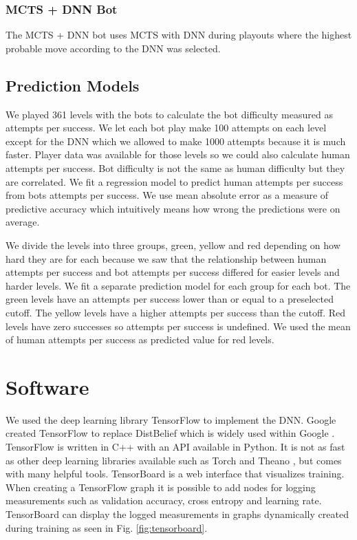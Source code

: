 \documentclass{kththesis}
\begin{document}
\subsubsection{MCTS + DNN Bot}
The MCTS + DNN bot uses MCTS with DNN during playouts where the highest probable move according to the DNN was selected.

\subsection{Prediction Models}
We played 361 levels with the bots to calculate the bot difficulty measured as attempts per success. We let each bot play make 100 attempts on each level except for the DNN which we allowed to make 1000 attempts because it is much faster. Player data was available for those levels so we could also calculate human attempts per success. Bot difficulty is not the same as human difficulty but they are correlated. We fit a regression model to predict human attempts per success from bots attempts per success. We use mean absolute error as a measure of predictive accuracy which intuitively means how wrong the predictions were on average.

We divide the levels into three groups, green, yellow and red depending on how hard they are for each because we saw that the relationship between human attempts per success and bot attempts per success differed for easier levels and harder levels. We fit a separate prediction model for each group for each bot. The green levels have an attempts per success lower than or equal to a preselected cutoff. The yellow levels  have a higher attempts per success than the cutoff. Red levels have zero successes so attempts per success is undefined. We used the mean of human attempts per success as predicted value for red levels.

\section{Software}
We used the deep learning library TensorFlow to implement the DNN. Google created TensorFlow to replace DistBelief which is widely used within Google \cite{abadi2016tensorflow}. TensorFlow is written in C++ with an API available in Python. It is not as fast as other deep learning libraries available such as Torch and Theano \cite{bahrampour2015comparative}, but comes with many helpful tools. TensorBoard is a web interface that visualizes training. When creating a TensorFlow graph it is possible to add nodes for logging measurements such as validation accuracy, cross entropy and learning rate. TensorBoard can display the logged measurements in graphs  dynamically created during training as seen in Fig. \ref{fig:tensorboard}. 
\end{document}
